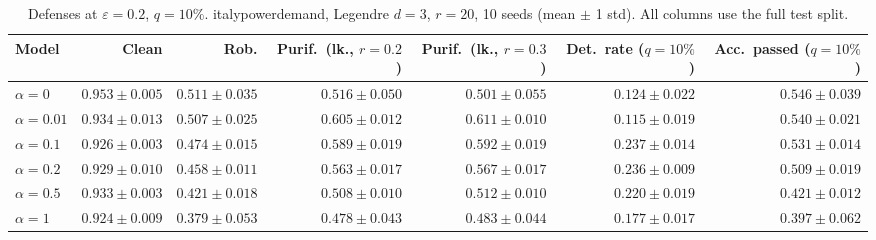 \begin{table}[htbp]
  \centering
  \small
  \begin{tabular}{@{}lrrrrrr@{}}
    \toprule
    Model & Clean & Rob. & Purif.\ (lk., $r{=}0.2$) & Purif.\ (lk., $r{=}0.3$) & Det.\ rate ($q{=}10\%$) & Acc.\ passed ($q{=}10\%$) \\
    \midrule
    $\alpha{=}0$ & $\mathbf{0.953 \pm 0.005}$ & $\mathbf{0.511 \pm 0.035}$ & $0.516 \pm 0.050$ & $0.501 \pm 0.055$ & $0.124 \pm 0.022$ & $\mathbf{0.546 \pm 0.039}$ \\
    $\alpha{=}0.01$ & $0.934 \pm 0.013$ & $0.507 \pm 0.025$ & $\mathbf{0.605 \pm 0.012}$ & $\mathbf{0.611 \pm 0.010}$ & $0.115 \pm 0.019$ & $0.540 \pm 0.021$ \\
    $\alpha{=}0.1$ & $0.926 \pm 0.003$ & $0.474 \pm 0.015$ & $0.589 \pm 0.019$ & $0.592 \pm 0.019$ & $\mathbf{0.237 \pm 0.014}$ & $0.531 \pm 0.014$ \\
    $\alpha{=}0.2$ & $0.929 \pm 0.010$ & $0.458 \pm 0.011$ & $0.563 \pm 0.017$ & $0.567 \pm 0.017$ & $0.236 \pm 0.009$ & $0.509 \pm 0.019$ \\
    $\alpha{=}0.5$ & $0.933 \pm 0.003$ & $0.421 \pm 0.018$ & $0.508 \pm 0.010$ & $0.512 \pm 0.010$ & $0.220 \pm 0.019$ & $0.421 \pm 0.012$ \\
    $\alpha{=}1$ & $0.924 \pm 0.009$ & $0.379 \pm 0.053$ & $0.478 \pm 0.043$ & $0.483 \pm 0.044$ & $0.177 \pm 0.017$ & $0.397 \pm 0.062$ \\
    \bottomrule
  \end{tabular}
  \caption{Defenses at $\varepsilon=0.2$, $q{=}10\%$. italypowerdemand, Legendre $d{=}3$, $r{=}20$, 10 seeds (mean $\pm$ 1 std). All columns use the full test split.}
  \label{tab:italypowerdemand_models_r20_eps0.2}
\end{table}
